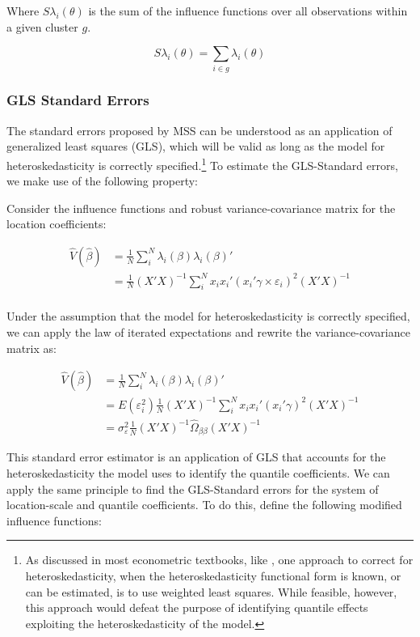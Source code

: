 \documentclass[
  authoryear,
  review,
  1p]{elsarticle}
\begin{document}
Where \(S\lambda_i(\theta)\) is the sum of the influence functions over
all observations within a given cluster \(g\).

\[S\lambda_i(\theta) = \sum_{i\in g} \lambda_i(\theta)
\]

\subsubsection{GLS Standard Errors}\label{gls-standard-errors}

The standard errors proposed by MSS can be understood as an application
of generalized least squares (GLS), which will be valid as long as the
model for heteroskedasticity is correctly specified.\footnote{As
  discussed in most econometric textbooks, like \citet{cameron2005}, one
  approach to correct for heteroskedasticity, when the
  heteroskedasticity functional form is known, or can be estimated, is
  to use weighted least squares. While feasible, however, this approach
  would defeat the purpose of identifying quantile effects exploiting
  the heteroskedasticity of the model.} To estimate the GLS-Standard
errors, we make use of the following property:

Consider the influence functions and robust variance-covariance matrix
for the location coefficients:

\[\begin{aligned}
\hat V(\hat \beta) &= \frac{1}{N} \sum_i^N \lambda_{i}(\beta) \lambda_{i}(\beta)' \\
&= \frac{1}{N}  (X'X)^{-1}  \sum_i^N x_i x_i' ( x_i'\gamma \times \varepsilon_i)^2 (X'X)^{-1} \\
\end{aligned}
\]

Under the assumption that the model for heteroskedasticity is correctly
specified, we can apply the law of iterated expectations and rewrite the
variance-covariance matrix as:

\[\begin{aligned}
\hat V(\hat \beta) &= \frac{1}{N} \sum_i^N \lambda_{i}(\beta) \lambda_{i}(\beta)' \\
&= E(\varepsilon_i^2) \frac{1}{N}  (X'X)^{-1}  \sum_i^N x_i x_i' ( x_i'\gamma)^2 (X'X)^{-1} \\
&= \sigma^2_{\varepsilon} \frac{1}{N}  (X'X)^{-1}  \hat\Omega_{\beta\beta} (X'X)^{-1}  
\end{aligned}
\]

This standard error estimator is an application of GLS that accounts for
the heteroskedasticity the model uses to identify the quantile
coefficients. We can apply the same principle to find the GLS-Standard
errors for the system of location-scale and quantile coefficients. To do
this, define the following modified influence functions:
\end{document}
